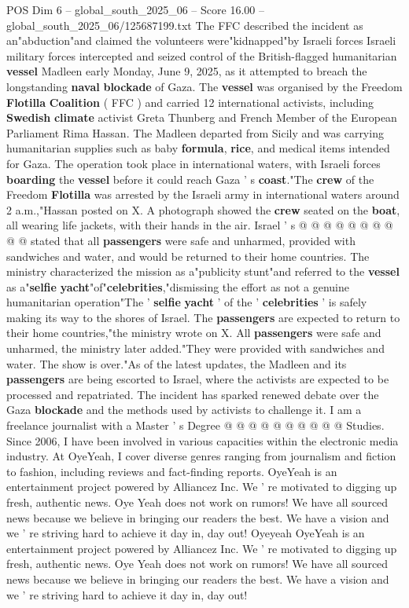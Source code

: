 \begin{textsample}{POS Dim 6 – global\_south\_2025\_06 – Score 16.00 – global\_south\_2025\_06/125687199.txt}  \label{ex:f6_pos_006}
The FFC described the incident as an"abduction"and claimed the volunteers were"kidnapped"by Israeli forces Israeli military forces intercepted and seized control of the British-flagged humanitarian \textbf{vessel} Madleen early Monday, June 9, 2025, as it attempted to breach the longstanding \textbf{naval} \textbf{blockade} of Gaza.
The \textbf{vessel} was organised by the Freedom \textbf{Flotilla} \textbf{Coalition} ( FFC ) and carried 12 international activists, including \textbf{Swedish} \textbf{climate} activist Greta Thunberg and French Member of the European Parliament Rima Hassan.
The Madleen departed from Sicily and was carrying humanitarian supplies such as baby \textbf{formula}, \textbf{rice}, and medical items intended for Gaza.
The operation took place in international waters, with Israeli forces \textbf{boarding} the \textbf{vessel} before it could reach Gaza ' s \textbf{coast}."The \textbf{crew} of the Freedom \textbf{Flotilla} was arrested by the Israeli army in international waters around 2 a.m.,"Hassan posted on X.
A photograph showed the \textbf{crew} seated on the \textbf{boat}, all wearing life jackets, with their hands in the air.
Israel ' s @ @ @ @ @ @ @ @ @ @ stated that all \textbf{passengers} were safe and unharmed, provided with sandwiches and water, and would be returned to their home countries.
The ministry characterized the mission as a"publicity stunt"and referred to the \textbf{vessel} as a"\textbf{selfie} \textbf{yacht}"of"\textbf{celebrities},"dismissing the effort as not a genuine humanitarian operation"The ' \textbf{selfie} \textbf{yacht} ' of the ' \textbf{celebrities} ' is safely making its way to the shores of Israel.
The \textbf{passengers} are expected to return to their home countries,"the ministry wrote on X.
All \textbf{passengers} were safe and unharmed, the ministry later added."They were provided with sandwiches and water.
The show is over."As of the latest updates, the Madleen and its \textbf{passengers} are being escorted to Israel, where the activists are expected to be processed and repatriated.
The incident has sparked renewed debate over the Gaza \textbf{blockade} and the methods used by activists to challenge it.
I am a freelance journalist with a Master ' s Degree @ @ @ @ @ @ @ @ @ @ Studies.
Since 2006, I have been involved in various capacities within the electronic media industry.
At OyeYeah, I cover diverse genres ranging from journalism and fiction to fashion, including reviews and fact-finding reports.
OyeYeah is an entertainment project powered by Alliancez Inc.
We ' re motivated to digging up fresh, authentic news.
Oye Yeah does not work on rumors!
We have all sourced news because we believe in bringing our readers the best.
We have a vision and we ' re striving hard to achieve it day in, day out!
Oyeyeah OyeYeah is an entertainment project powered by Alliancez Inc.
We ' re motivated to digging up fresh, authentic news.
Oye Yeah does not work on rumors!
We have all sourced news because we believe in bringing our readers the best.
We have a vision and we ' re striving hard to achieve it day in, day out!


\end{textsample}
